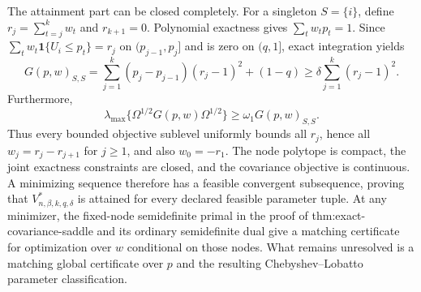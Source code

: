 The attainment part can be closed completely.  For a singleton \(S=\{i\}\), define \(r_j=\sum_{t=j}^kw_t\) and \(r_{k+1}=0\).  Polynomial exactness gives \(\sum_tw_tp_t=1\).  Since \(\sum_tw_t\mathbf1\{U_i\le p_t\}=r_j\) on \((p_{j-1},p_j]\) and is zero on \((q,1]\), exact integration yields
\[
G(p,w)_{S,S}
=\sum_{j=1}^k(p_j-p_{j-1})(r_j-1)^2+(1-q)
\ge\delta\sum_{j=1}^k(r_j-1)^2.
\]
Furthermore,
\[
\lambda_{\max}\{\Omega^{1/2}G(p,w)\Omega^{1/2}\}
\ge\omega_1G(p,w)_{S,S}.
\]
Thus every bounded objective sublevel uniformly bounds all \(r_j\), hence all \(w_j=r_j-r_{j+1}\) for \(j\ge1\), and also \(w_0=-r_1\).  The node polytope is compact, the joint exactness constraints are closed, and the covariance objective is continuous.  A minimizing sequence therefore has a feasible convergent subsequence, proving that \(V^*_{n,\beta,k,q,\delta}\) is attained for every declared feasible parameter tuple.  At any minimizer, the fixed-node semidefinite primal in the proof of thm:exact-covariance-saddle and its ordinary semidefinite dual give a matching certificate for optimization over \(w\) conditional on those nodes.  What remains unresolved is a matching global certificate over \(p\) and the resulting Chebyshev--Lobatto parameter classification.